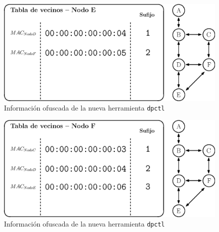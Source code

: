 \begin{figure}[ht!]
    \centering
    \includegraphics[width=\textwidth]{archivos/img/dev/topo_hello_nodoE_nb.eps}
    \caption{Información ofuscada de la nueva herramienta \texttt{dpctl}}
    \label{fig:topo_hello_nodoE_nb}
\end{figure}


\begin{figure}[ht!]
    \centering
    \includegraphics[width=\textwidth]{archivos/img/dev/topo_hello_nodoF_nb.eps}
    \caption{Información ofuscada de la nueva herramienta \texttt{dpctl}}
    \label{fig:topo_hello_nodoF_nb}
\end{figure}


